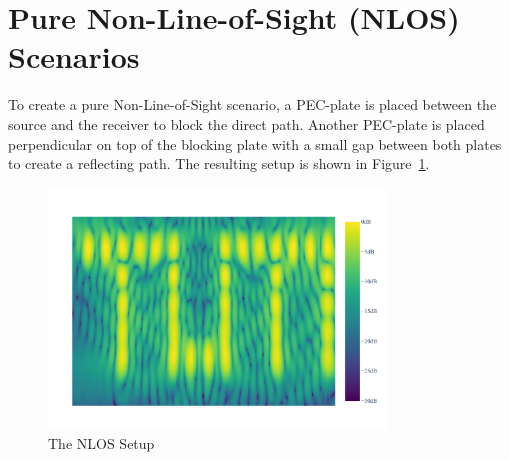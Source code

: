 \section{Pure Non-Line-of-Sight (NLOS) Scenarios}
To create a pure Non-Line-of-Sight scenario, a PEC-plate is placed between the source and the receiver to block the direct path.
Another PEC-plate is placed perpendicular on top of the blocking plate with a small gap between both plates to create a reflecting path.
The resulting setup is shown in Figure~\ref{fig:nlos_setup}.

\begin{figure}[p]
    \centering
    \includegraphics[trim=0 0 0 70pt, clip, page=3, width=0.8\textwidth]{figures/pure_nlos.pdf}
    \caption{The NLOS Setup}\label{fig:nlos_setup}


\end{figure}
